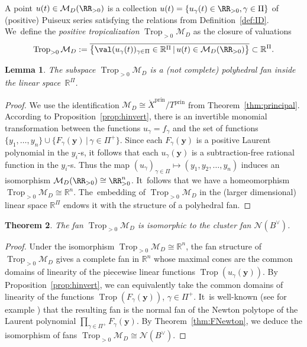 \documentclass[pdftex]{sigma}%
\def\R{{\mathbb R}}
\def\Xo{{\mathring{X}}}
\def\prin{{\operatorname{prin}}}
\def\M{{\mathcal{M}}}
\def\y{{\mathbf y}}
\def\N{{\mathcal{N}}}
\def\Trop{\operatorname{Trop}}
\numberwithin{equation}{section}
\newtheorem{Theorem}{Theorem}[section]
\newtheorem{Lemma}[Theorem]{Lemma}
\begin{document}
A point $u(t) \in \M_D(\RR_{>0})$ is a collection $u(t) = \{u_\gamma(t) \in \RR_{>0}, \gamma \in \Pi\}$ of (positive) Puiseux series satisfying the relations from Definition~\ref{def:ID}. We~define the \emph{positive tropicalization} $\Trop_{>0} \M_D$ as the closure of valuations
\begin{gather*}
\Trop_{>0} \M_D := \overline{\big\{\val(u_\gamma(t))_{ \gamma \in \Pi}\in \R^\Pi \,|\, u(t) \in \M_D(\RR_{>0})\big\}} \subset \R^\Pi.
\end{gather*}
\begin{Lemma}
The subspace $\Trop_{>0} \M_D$ is a (not complete) polyhedral fan inside the linear space~$\R^\Pi$.
\end{Lemma}
\begin{proof}
We use the identification $\M_D \cong \Xo^\prin/T^\prin$ from Theorem~\ref{thm:principal}. According to Proposition~\ref{prop:hinvert}, there is an invertible monomial transformation between the functions $u_\gamma = f_\gamma$ and the set of functions $\{y_1,\dots,y_n\} \cup \{ F_\gamma(\y) \,|\, \gamma \in \Pi^+\}$. Since each $F_\gamma(\y)$ is a positive Laurent polynomial in the $y_i$-s, it follows that each $u_\gamma(\y)$ is a subtraction-free rational function in the $y_i$-s. Thus the map $(u_\gamma)_{\gamma \in \Pi} \mapsto (y_1,y_2,\dots,y_n)$ induces an isomorphism $\M_D(\RR_{>0}) \cong \RR_{>0}^n$. It~follows that we have a homeomorphism $\Trop_{>0}\M_D \cong \R^n$. The~embedding of $\Trop_{>0}\M_D$ in the (larger dimensional) linear space $\R^\Pi$ endows it with the structure of a polyhedral fan.
\end{proof}

\begin{Theorem}\label{thm:tropMD}
The fan $\Trop_{>0}\M_D$ is isomorphic to the cluster fan $\N(B^\vee)$.
\end{Theorem}
\begin{proof}
Under the isomorphism $\Trop_{>0}\M_D \cong \R^n$, the fan structure of $\Trop_{>0}\M_D$ gives a complete fan in $\R^n$ whose maximal cones are the common domains of linearity of the piecewise linear functions $\Trop(u_\gamma(\y))$. By Proposition~\ref{prop:hinvert}, we can equivalently take the common domains of linearity of the functions $\Trop(F_\gamma(\y))$, $\gamma \in \Pi^+$. It~is well-known (see for example \cite[Section~11.1]{ALS2}) that the resulting fan is the normal fan of the Newton polytope of the Laurent polynomial $\prod_{\gamma \in \Pi^+} F_\gamma(\y)$. By Theorem~\ref{thm:FNewton}, we deduce the isomorphism of fans $\Trop_{>0}\M_D \cong \N(B^\vee)$.
\end{proof}
\end{document}
